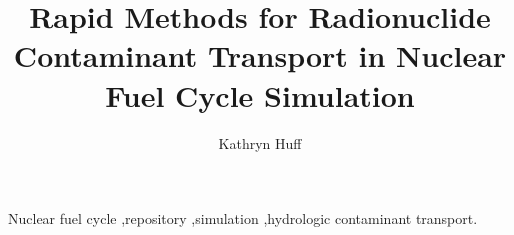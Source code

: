 \documentclass[final,3p,times,twocolumn]{elsarticle}
\begin{document}
\begin{frontmatter}



\title{Rapid Methods for Radionuclide Contaminant Transport in Nuclear Fuel Cycle Simulation} 


\author[berk]{Kathryn Huff}
  \address[berk]{Department of Nuclear Engineering, University of California, 2521 Hearst Ave., Berkeley, CA 94709}


   \begin{abstract}
     

   \end{abstract}

   \begin{keyword}

     Nuclear fuel cycle \sep repository \sep simulation \sep hydrologic contaminant 
     transport. 


   \end{keyword}

 \end{frontmatter}

  \linenumbers

  
  
\end{document}
